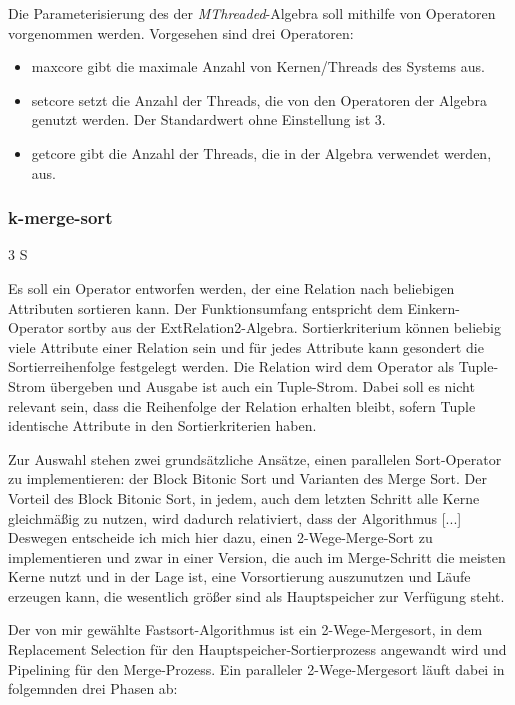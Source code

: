 \documentclass[a4paper,12pt,twoside]{article}
\newcommand{\Fb}[1]{\textit{#1}} %
\begin{document}
Die Parameterisierung des der \Fb{MThreaded}-Algebra soll mithilfe von Operatoren vorgenommen werden. Vorgesehen sind drei Operatoren:

\begin{itemize}
	\item maxcore gibt die maximale Anzahl von Kernen/Threads des Systems aus.
	\item setcore setzt die Anzahl der Threads, die von den Operatoren der Algebra genutzt werden. Der Standardwert ohne Einstellung ist 3.
	\item getcore gibt die Anzahl der Threads, die in der Algebra verwendet werden, aus.
\end{itemize}

\subsubsection{k-merge-sort} 3 S

Es soll ein Operator entworfen werden, der eine Relation nach beliebigen Attributen sortieren kann. Der Funktionsumfang entspricht dem Einkern-Operator sortby aus der ExtRelation2-Algebra. Sortierkriterium können beliebig viele Attribute einer Relation sein und für jedes Attribute kann gesondert die Sortierreihenfolge festgelegt werden. Die Relation wird dem Operator als Tuple-Strom übergeben und Ausgabe ist auch ein Tuple-Strom. Dabei soll es nicht relevant sein, dass die Reihenfolge der Relation erhalten bleibt, sofern Tuple identische Attribute in den Sortierkriterien haben.

Zur Auswahl stehen zwei grundsätzliche Ansätze, einen parallelen Sort-Operator zu implementieren: der Block Bitonic Sort und Varianten des Merge Sort. Der Vorteil des Block Bitonic Sort, in jedem, auch dem letzten Schritt alle Kerne gleichmäßig zu nutzen, wird dadurch relativiert, dass der Algorithmus [...] Deswegen entscheide ich mich hier dazu, einen 2-Wege-Merge-Sort zu implementieren und zwar in einer Version, die auch im Merge-Schritt die meisten Kerne nutzt und in der Lage ist, eine Vorsortierung auszunutzen und Läufe erzeugen kann, die wesentlich größer sind als Hauptspeicher zur Verfügung steht.

Der von mir gewählte Fastsort-Algorithmus ist ein 2-Wege-Mergesort, in dem Replacement Selection für den Hauptspeicher-Sortierprozess angewandt wird und Pipelining für den Merge-Prozess. Ein paralleler 2-Wege-Mergesort läuft dabei in folgemnden drei Phasen ab:
\end{document}
